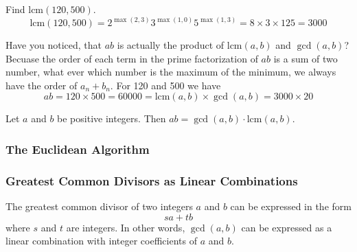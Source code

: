     \begin{example}
        Find lcm$(120, 500)$.
        $$\text{lcm}(120,500)=2^{\max(2,3)}3^{\max(1,0)}5^{\max(1,3)} = 8\times 3 \times 125= 3000$$
    \end{example}
    Have you noticed, that $ab$ is actually the product of $\text{lcm}(a,b)$ and $\gcd(a,b)$? Becuase the order of each
    term in the prime factorization of $ab$ is a sum of two number, what ever which number is the maximum of the minimum,
    we always have the order of $a_n+b_n$. For 120 and 500 we have 
    $$ab = 120\times 500 = 60000 = \text{lcm}(a,b)\times \gcd(a,b) = 3000\times 20$$

    \begin{theorem}
        Let $a$ and $b$ be positive integers. Then $ab= \gcd ( a, b) \cdot $lcm$( a, b).$
    \end{theorem}

    \subsubsection*{The Euclidean Algorithm}

    \subsubsection*{Greatest Common Divisors as Linear Combinations}
        The greatest common divisor of two integers $a$ and $b$ can be expressed in the form
        $$sa + tb$$
        where $s$ and $t$ are integers. In other words, $\gcd(a, b)$ can be expressed as a linear combination with 
        integer coefficients of $a$ and $b$. 

